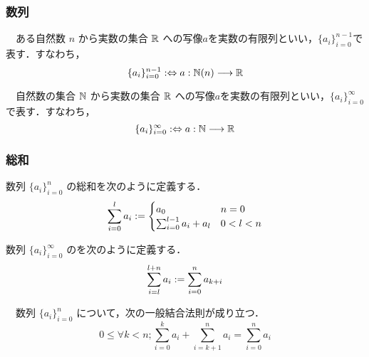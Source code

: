 \documentclass[autodetect-engine,dvipdfmx-if-dvi,ja=standard,a4paper,12pt]{bxjsbook}
\begin{document}
				\subsubsection{数列}
					\begin{dfn}[有限列]　ある自然数 $n$ から実数の集合 $\mathbb{R}$ への写像$a$を実数の有限列といい，$\{ a_{i} \}_{i=0}^{n-1}$で表す．すなわち，
						\begin{equation}
							\{a_i\}_{i=0}^{n-1} :\Leftrightarrow a: \mathbb{N}(n) \longrightarrow \mathbb{R}
						\end{equation}
					\end{dfn}
					\begin{dfn}[無限列]　自然数の集合 $\mathbb{N}$ から実数の集合 $\mathbb{R}$ への写像$a$を実数の有限列といい，$\{ a_{i} \}_{i=0}^{\infty}$で表す．すなわち，
						\begin{equation}
							\{a_i\}_{i=0}^{\infty} :\Leftrightarrow a: \mathbb{N} \longrightarrow \mathbb{R}
						\end{equation}
				\end{dfn}
				\subsubsection{総和}
					\begin{dfn} 数列 $\{a_i\}_{i=0}^{n}$ の総和を次のように定義する．
						\begin{equation}
							\sum_{i=0}^{l} a_i := \begin{cases}
								a_0 & n = 0 \\
								\sum_{i=0}^{l-1} a_i + a_{l} &  0 < l <n
							\end{cases}
						\end{equation}
					\end{dfn}
				
					\begin{dfn} 数列 $\{a_i\}_{i=0}^{\infty}$ のを次のように定義する．
						\begin{equation}
							\sum_{i=l}^{l+n} a_i := \sum_{i=0}^{n} a_{k+i}
						\end{equation}
					\end{dfn}
				
					\begin{thm}[結合法則]　数列 $\{a_i\}_{i=0}^{n}$ について，次の一般結合法則が成り立つ．
						\begin{equation}
							0 \le \forall k < n ; \sum_{i=0}^{k} a_i + \sum_{i=k+1}^{n} a_i = \sum_{i=0}^{n} a_i
						\end{equation} 
					\end{thm}
				
\end{document}
